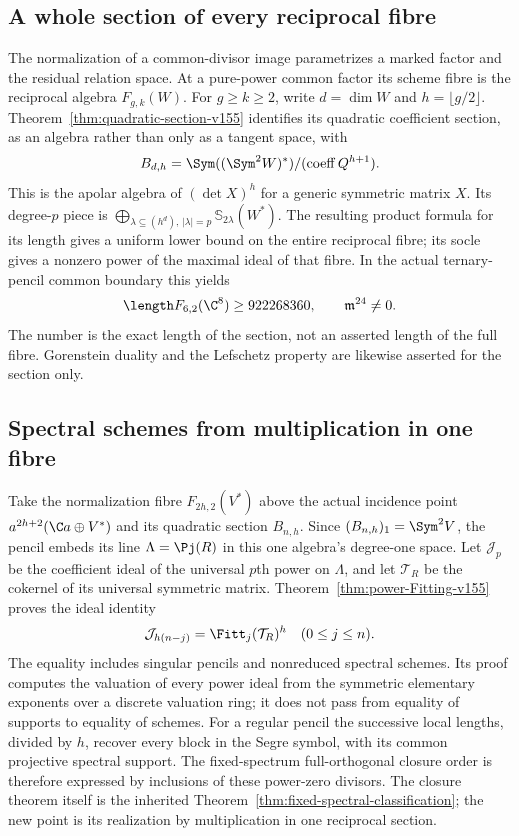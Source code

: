 \subsection{A whole section of every reciprocal fibre}
The normalization of a common-divisor image parametrizes a marked
factor and the residual relation space.  At a pure-power common
factor its scheme fibre is the reciprocal algebra $F_{g,k}(W)$.
For $g\geq k\geq2$, write $d=\dim W$ and $h=\lfloor g/2\rfloor$.
Theorem~\ref{thm:quadratic-section-v155} identifies its quadratic
coefficient section, as an algebra rather than only as a tangent
space, with
\[
 B_{d,h}=\Sym((\Sym^2W)^*)/(\operatorname{coeff}Q^{h+1}).
\]
This is the apolar algebra of $(\det X)^h$ for a generic symmetric
matrix $X$.  Its degree-$p$ piece is
$\bigoplus_{\lambda\subseteq(h^d),\,|\lambda|=p}
\mathbb S_{2\lambda}(W^*)$.  The resulting product formula for its
length gives a uniform lower bound on the entire reciprocal fibre;
its socle gives a nonzero power of the maximal ideal of that fibre.
In the actual ternary-pencil common boundary this yields
\[
             \length F_{6,2}(\C^8)\geq922268360,
                     \qquad\mathfrak m^{24}\ne0.
\]
The number is the exact length of the section, not an asserted
length of the full fibre.  Gorenstein duality and the Lefschetz
property are likewise asserted for the section only.

\subsection{Spectral schemes from multiplication in one fibre}
Take the normalization fibre $F_{2h,2}(V^*)$ above the actual
incidence point $a^{2h+2}(\C a\oplus V^*)$ and its quadratic
section $B_{n,h}$.  Since $(B_{n,h})_1=\Sym^2V$, the pencil
embeds its line $\Lambda=\Pj(R)$ in this one algebra's degree-one
space.  Let $\mathcal J_p$ be the coefficient ideal of the
universal $p$th power on $\Lambda$, and let $\mathcal T_R$ be the
cokernel of its universal symmetric matrix.
Theorem~\ref{thm:power-Fitting-v155} proves the ideal identity
\[
              \mathcal J_{h(n-j)}=\Fitt_j(\mathcal T_R)^h
                           \quad(0\leq j\leq n).
\]
The equality includes singular pencils and nonreduced spectral
schemes.  Its proof computes the valuation of every power ideal
from the symmetric elementary exponents over a discrete valuation
ring; it does not pass from equality of supports to equality of
schemes.  For a regular pencil the successive local lengths, divided
by $h$, recover every block in the Segre symbol, with its common
projective spectral support.  The fixed-spectrum full-orthogonal
closure order is therefore expressed by inclusions of these
power-zero divisors.  The closure theorem itself is the inherited
Theorem~\ref{thm:fixed-spectral-classification}; the new point is its
realization by multiplication in one reciprocal section.


